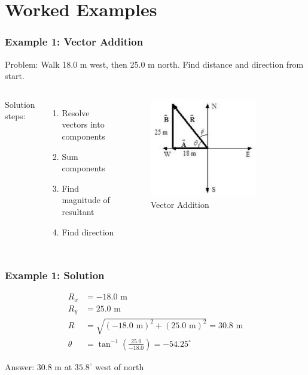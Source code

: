 \documentclass{beamer}
\begin{document}
\section{Worked Examples}

\begin{frame}
\frametitle{Example 1: Vector Addition}
Problem: Walk 18.0 m west, then 25.0 m north. Find distance and direction from start.

\begin{columns}
Solution steps:
\begin{enumerate}
\item Resolve vectors into components
\item Sum components
\item Find magnitude of resultant
\item Find direction
\end{enumerate}

\begin{figure}
\centering
\includegraphics[width=0.8\textwidth]{phys12-vectors-vector-addition-figure-4.png}
\caption{Vector Addition}
\end{figure}
\end{columns}
\end{frame}

\begin{frame}
\frametitle{Example 1: Solution}
\begin{align*}
R_x &= -18.0 \text{ m} \\
R_y &= 25.0 \text{ m} \\
R &= \sqrt{(-18.0 \text{ m})^2 + (25.0 \text{ m})^2} = 30.8 \text{ m} \\
\theta &= \tan^{-1} \left( \frac{25.0}{-18.0} \right) = -54.25^\circ
\end{align*}

Answer: 30.8 m at $35.8^\circ$ west of north
\end{frame}
\end{document}
